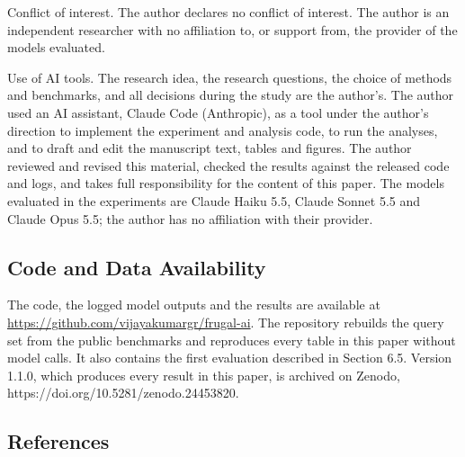 \documentclass[
  10pt,
]{article}
\begin{document}
Conflict of interest. The author declares no conflict of interest. The
author is an independent researcher with no affiliation to, or support
from, the provider of the models evaluated.

Use of AI tools. The research idea, the research questions, the choice
of methods and benchmarks, and all decisions during the study are the
author's. The author used an AI assistant, Claude Code (Anthropic), as a
tool under the author's direction to implement the experiment and
analysis code, to run the analyses, and to draft and edit the manuscript
text, tables and figures. The author reviewed and revised this material,
checked the results against the released code and logs, and takes full
responsibility for the content of this paper. The models evaluated in
the experiments are Claude Haiku 5.5, Claude Sonnet 5.5 and Claude Opus
5.5; the author has no affiliation with their provider.

\subsection{Code and Data
Availability}\label{code-and-data-availability}

The code, the logged model outputs and the results are available at
\url{https://github.com/vijayakumargr/frugal-ai}. The repository
rebuilds the query set from the public benchmarks and reproduces every
table in this paper without model calls. It also contains the first
evaluation described in Section 6.5. Version 1.1.0, which produces every
result in this paper, is archived on Zenodo,
https://doi.org/10.5281/zenodo.24453820.

\subsection{References}\label{references}
\end{document}
